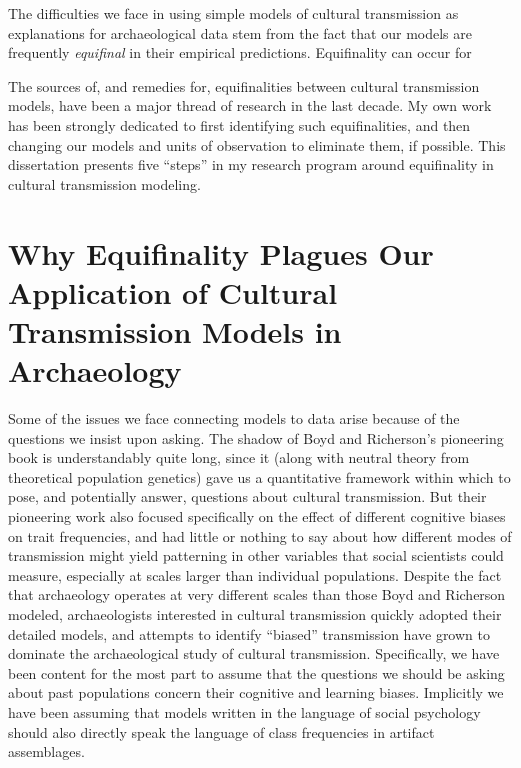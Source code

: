 The difficulties we face in using simple models of cultural transmission as explanations for archaeological data stem from the fact that our models are frequently \emph{equifinal} in their empirical predictions.  Equifinality can occur for 

The sources of, and remedies for, equifinalities between cultural transmission models, have been a major thread of research in the last decade.  My own work has been strongly dedicated to first identifying such equifinalities, and then changing our models and units of observation to eliminate them, if possible.  This dissertation presents five ``steps'' in my research program around equifinality in cultural transmission modeling.  

\section{Why Equifinality Plagues Our Application of Cultural Transmission Models in Archaeology}
\label{sec:equifinality}

Some of the issues we face connecting models to data arise because of the questions we insist upon asking.  The shadow of Boyd and Richerson's \citeyearpar{BR1985} pioneering book is understandably quite long, since it (along with neutral theory from theoretical population genetics) gave us a quantitative framework within which to pose, and potentially answer, questions about cultural transmission.  But their pioneering work also focused specifically on the effect of different cognitive biases on trait frequencies, and had little or nothing to say about how different modes of transmission might yield patterning in other variables that social scientists could measure, especially at scales larger than individual populations.  Despite the fact that archaeology operates at very different scales than those Boyd and Richerson modeled, archaeologists interested in cultural transmission quickly adopted their detailed models, and attempts to identify ``biased'' transmission have grown to dominate the archaeological study of cultural transmission.  Specifically, we have been content for the most part to assume that the questions we should be asking about past populations concern their cognitive and learning biases.  Implicitly we have been assuming that models written in the language of social psychology should also directly speak the language of class frequencies in artifact assemblages.  

